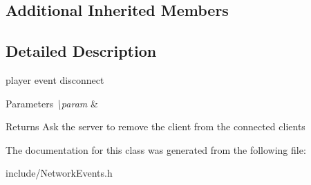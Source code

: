 \subsection*{Additional Inherited Members}


\subsection{Detailed Description}
player event disconnect 


\begin{DoxyParams}{Parameters}
{\em \textbackslash{}param} & \\
\hline
\end{DoxyParams}
\begin{DoxyReturn}{Returns}
Ask the server to remove the client from the connected clients 
\end{DoxyReturn}


The documentation for this class was generated from the following file\-:\begin{DoxyCompactItemize}
\item 
include/Network\-Events.\-h\end{DoxyCompactItemize}
